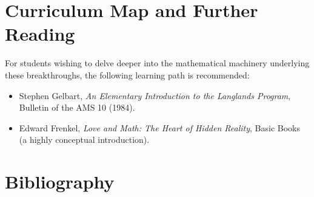 \section{Curriculum Map and Further Reading}
For students wishing to delve deeper into the mathematical machinery underlying these breakthroughs, the following learning path is recommended:
\begin{itemize}
  \item Stephen Gelbart, \emph{An Elementary Introduction to the Langlands Program}, Bulletin of the AMS 10 (1984).
  \item Edward Frenkel, \emph{Love and Math: The Heart of Hidden Reality}, Basic Books (a highly conceptual introduction).
\end{itemize}

\section*{Bibliography}

